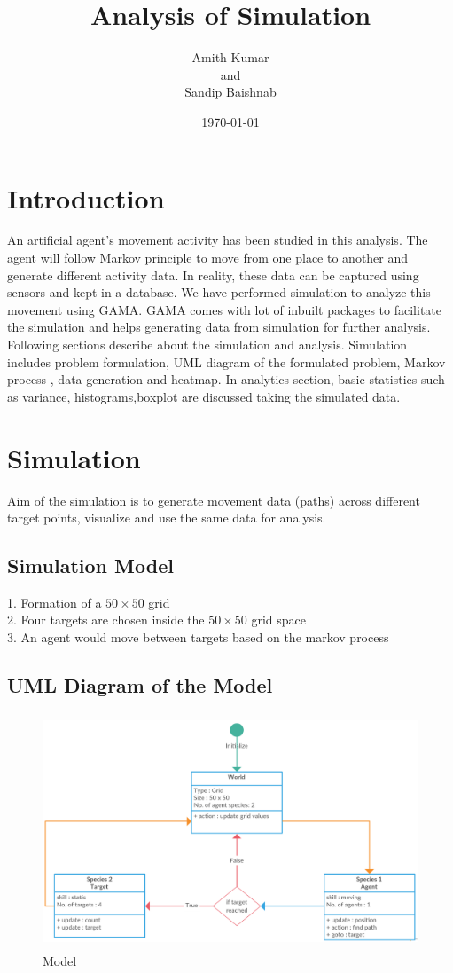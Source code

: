 \documentclass[11pt]{report}
\title{\color{cyan} Analysis of Simulation}
\author{Amith Kumar\\and \\Sandip Baishnab}
\date{\today}
\begin{document}
\maketitle
\tableofcontents
\newpage
\section{\color{cyan} Introduction}
An artificial agent's movement activity has been studied in this analysis. The agent will follow Markov principle to move from one place to another and generate different activity data. In reality, these data can be captured using sensors and kept in a database. We have performed simulation to analyze this movement using GAMA. GAMA comes with lot of inbuilt packages to facilitate the simulation and helps generating data from simulation for further analysis. Following sections describe about the simulation and analysis. Simulation includes  problem formulation, UML diagram of the formulated problem, Markov process , data generation and heatmap. In analytics section, basic statistics such as  variance, histograms,boxplot are discussed taking the simulated data.      

\section{\color{cyan} Simulation }
Aim of the simulation is to generate movement data (paths) across different target points, visualize and use the same data for analysis.
\subsection{Simulation Model}
1. Formation of a $50\times 50$ grid\\
2. Four targets are chosen inside the $50\times 50$ grid space\\
3. An agent would move between targets based on the markov process\\
\subsection{UML Diagram of the Model}

\begin{figure}[h!]
  \centering
  \includegraphics[height = 7cm, width = 14cm]{Simple_Grid_Move.png}
  \caption{Model}
  \label{fig:Model}
\end{figure}
\end{document}
